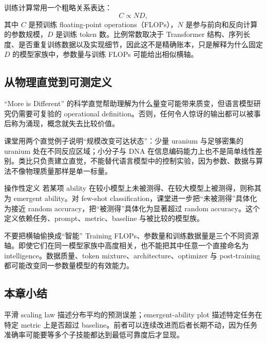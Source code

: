 训练计算常用一个粗略关系表达：
\[
C \propto N D,
\]
其中 $C$ 是预训练 floating-point operations（FLOPs），$N$ 是参与前向和反向计算的参数规模，$D$ 是训练 token 数。比例常数取决于 Transformer 结构、序列长度、是否重复训练数据以及实现细节，因此这不是精确账本，只是解释为什么固定 $D$ 的模型家族中，参数量与训练 FLOPs 可能给出相似横轴。


\subsection{从物理直觉到可测定义}

``More is Different'' 的科学直觉帮助理解为什么量变可能带来质变，但语言模型研究仍需要可复验的 operational definition。否则，任何令人惊讶的输出都可以被事后称为涌现，概念就失去比较价值。


课堂用两个直觉例子说明“规模改变可达状态”：少量 uranium 与足够密集的 uranium 处在不同反应区域；小分子与 DNA 在信息编码能力上也不是简单线性差别。类比只负责建立直觉，不能替代语言模型中的控制实验，因为参数、数据与算法不像物理质量那样是单一标量。


\begin{importantbox}{操作性定义}
若某项 ability 在较小模型上未被测得、在较大模型上被测得，则称其为 emergent ability。对 few-shot classification，课堂进一步把“未被测得”具体化为接近 random accuracy，把“被测得”具体化为显著超过 random accuracy。这个定义依赖任务、prompt、metric、baseline 与被比较的模型族。
\end{importantbox}

\begin{warningbox}{不要把横轴偷换成“智能”}
Training FLOPs、参数量和训练数据量是三个不同资源轴。即使它们在同一模型家族中高度相关，也不能把其中任意一个直接命名为 intelligence。数据质量、token mixture、architecture、optimizer 与 post-training 都可能改变同一参数量模型的有效能力。
\end{warningbox}

\subsection{本章小结}

平滑 scaling law 描述分布平均的预测误差；emergent-ability plot 描述特定任务在特定 metric 上是否超过 baseline。前者可以连续改进而后者长期不动，因为任务准确率可能要等多个子技能都达到最低可靠度后才显现。

